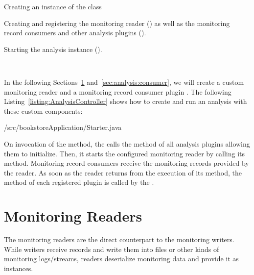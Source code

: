 \enlargethispage{1cm}

\begin{compactenum}
\item Creating an instance of the  class
\item Creating and registering the monitoring reader () as %
well as the monitoring record consumers and other analysis plugins ().
\item Starting the analysis instance ().
\end{compactenum}

\

\noindent In the following Sections~\ref{sec:analysis:reader} and~\ref{sec:analysis:consumer}, %
we will create a custom monitoring reader  and a %
monitoring record consumer plugin . %
\noindent The following Listing~\ref{listing:AnalysisController} shows how to create and run an analysis %
with these custom components:

\setJavaCodeListing
%
{\customComponentsBookstoreApplicationDir/src/bookstoreApplication/Starter.java}

\noindent On invocation of the  method, the  %
calls the  method of all analysis plugins allowing them to initialize. %
Then, it starts the configured monitoring reader by calling its  %
method. Monitoring record consumers receive the monitoring records provided by %
the reader. As soon as the reader returns from the execution of its  
method, the method  of each registered plugin is called by the %
.

\section{Monitoring Readers}\label{sec:analysis:reader}

The monitoring readers are the direct counterpart to the monitoring %
writers. While writers receive records and write them into files or other kinds %
of monitoring logs/streams, readers deserialize monitoring data and provide it as %
 instances. 


